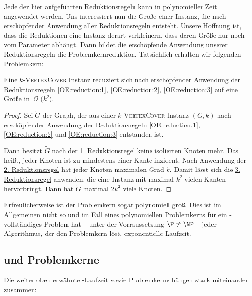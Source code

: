 \documentclass[a4paper,ngerman]{atseminar}
\newcommand{\BigO}[1]{\ensuremath{\operatorname{\mathcal{O}}\bigl(#1\bigr)}\xspace}
\begin{document}
\begin{example}
    \noindent
    Jede der hier aufgeführten Reduktionsregeln kann in polynomieller Zeit angewendet werden. Uns interessiert nun die Größe einer
    Instanz, die nach erschöpfender Anwendung aller Reduktionsregeln entsteht. Unsere Hoffnung ist, dass die Reduktionen eine Instanz derart
    verkleinern, dass deren Größe nur noch vom Parameter abhängt. Dann bildet die erschöpfende Anwendung unserer Reduktionsregeln die
    Problemkernreduktion.
    Tatsächlich erhalten wir folgenden Problemkern:
    \begin{theorem}
      Eine $k$-\textsc{VertexCover} Instanz reduziert sich nach erschöpfender Anwendung der Reduktionsregeln \ref{OE:reduction:1}, \ref{OE:reduction:2}, \ref{OE:reduction:3} auf
      eine Größe in \BigO{k^2}.
    \end{theorem}
    \begin{proof}
      Sei $\tilde{G}$ der Graph, der aus einer $k$-\textsc{VertexCover} Instanz $(G, k)$ nach erschöpfender Anwendung der Reduktionsregeln \ref{OE:reduction:1}, \ref{OE:reduction:2} und \ref{OE:reduction:3} entstanden ist.

      \noindent
      Dann besitzt $\tilde{G}$ nach der \hyperref[OE:reduction:1]{1. Reduktionsregel} keine isolierten Knoten mehr. Das heißt, jeder Knoten ist zu mindestens einer
      Kante inzident.
      Nach Anwendung der \hyperref[OE:reduction:2]{2. Reduktionsregel} hat jeder Knoten maximalen Grad $k$.
      Damit lässt sich die \hyperref[OE:reduction:3]{3. Reduktionsregel} anwenden, die eine Instanz mit maximal $k^2$ vielen Kanten
      hervorbringt.
      Dann hat $\tilde{G}$ maximal $2k^2$ viele Knoten.
    \end{proof}

    \noindent
    Erfreulicherweise ist der Problemkern sogar polynomiell groß. Dies ist im Allgemeinen nicht so und im Fall eines polynomiellen
    Problemkerns für ein \NP-vollständiges Problem hat -- unter der Vorraussetzung $\P \neq \NP$ -- jeder Algorithmus, der den Problemkern löst, exponentielle Laufzeit.
\end{example}

\subsection{\FPT\xspace und Problemkerne}

Die weiter oben erwähnte \hyperref[OE:def:fpt]{\FPT-Laufzeit} sowie \hyperref[OE:sec:kernel]{Problemkerne} hängen stark miteinander zusammen:
\end{document}
